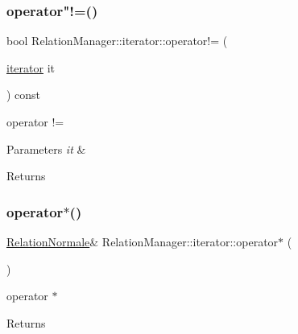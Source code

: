 \subsubsection{\texorpdfstring{operator"!=()}{operator!=()}}
{\footnotesize\ttfamily bool Relation\+Manager\+::iterator\+::operator!= (\begin{DoxyParamCaption}\item[{\hyperlink{class_relation_manager_1_1iterator}{iterator}}]{it }\end{DoxyParamCaption}) const\hspace{0.3cm}{\ttfamily [inline]}}



operator != 


\begin{DoxyParams}{Parameters}
{\em it} & \\
\hline
\end{DoxyParams}
\begin{DoxyReturn}{Returns}

\end{DoxyReturn}
\mbox{\label{class_relation_manager_1_1iterator_aa3e467a4308e8c8f58564d68caebafbb}} 
\subsubsection{\texorpdfstring{operator$\ast$()}{operator*()}}
{\footnotesize\ttfamily \hyperlink{class_relation_normale}{Relation\+Normale}\& Relation\+Manager\+::iterator\+::operator$\ast$ (\begin{DoxyParamCaption}{ }\end{DoxyParamCaption})\hspace{0.3cm}{\ttfamily [inline]}}



operator $\ast$ 

\begin{DoxyReturn}{Returns}

\end{DoxyReturn}
\mbox{\label{class_relation_manager_1_1iterator_a0aef75ae2f7e66f9f510b559c0a73653}} 
